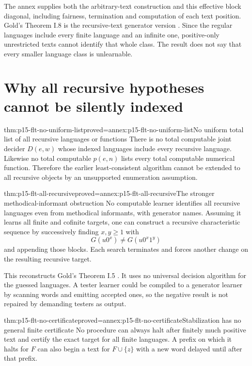 The annex supplies both the arbitrary-text construction and
this effective block diagonal, including fairness, termination
and computation of each text position.
Gold's Theorem I.8 is the recursive-text generator version
\cite[pp.\ 470--471]{Gold1967IdentificationFLT}.
Since the regular languages include every finite language
and an infinite one, positive-only unrestricted texts
cannot identify that whole class. The result does not say
that every smaller language class is unlearnable.

\section{Why all recursive hypotheses cannot be silently indexed}
\label{sec:p15-flt-index-boundary}

\begin{hbtheorem}{thm:p15-flt-no-uniform-list}{proved=annex:p15-flt-no-uniform-list}{No uniform total list of all recursive languages or functions}
There is no total computable joint decider \(D(e,w)\)
whose indexed languages include every recursive language.
Likewise no total computable \(p(e,n)\) lists every total
computable numerical function. Therefore the earlier
least-consistent algorithm cannot be extended to all
recursive objects by an unsupported enumeration assumption.
\end{hbtheorem}

\begin{hbtheorem}{thm:p15-flt-all-recursive}{proved=annex:p15-flt-all-recursive}{The stronger methodical-informant obstruction}
No computable learner identifies all recursive languages
even from methodical informants, with generator names.
Assuming it learns all finite and cofinite targets,
one can construct a recursive characteristic sequence by
successively finding \(x,y\geq1\) with
\[
 G(u0^x)\ne G(u0^x1^y)
\]
and appending those blocks. Each search terminates and
forces another change on the resulting recursive target.
\end{hbtheorem}

This reconstructs Gold's Theorem I.5
\cite[pp.\ 468--469]{Gold1967IdentificationFLT}.
It uses no universal decision algorithm for the guessed
languages. A tester learner could be compiled to a
generator learner by scanning words and emitting accepted
ones, so the negative result is not repaired by demanding
testers as output.

\begin{hbtheorem}{thm:p15-flt-no-certificate}{proved=annex:p15-flt-no-certificate}{Stabilization has no general finite certificate}
No procedure can always halt after finitely much positive
text and certify the exact target for all finite languages.
A prefix on which it halts for \(F\) can also begin a
text for \(F\cup\{z\}\) with a new word delayed until
after that prefix.
\end{hbtheorem}

